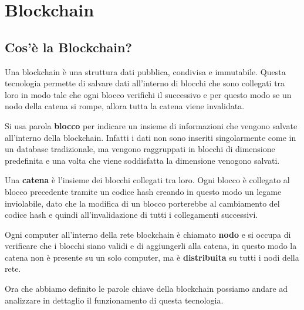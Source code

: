 \section{Blockchain}

\subsection{Cos'è la Blockchain?}
Una blockchain è una struttura dati pubblica, condivisa e immutabile.
Questa tecnologia permette di salvare dati all'interno di blocchi che sono 
collegati tra loro in modo tale che ogni blocco verifichi il successivo e per 
questo modo se un nodo della catena si rompe, allora tutta la catena viene
invalidata.

Si usa parola \textbf{blocco} per indicare un insieme di informazioni che
vengono salvate all'interno della blockchain. Infatti i dati non sono inseriti
singolarmente come in un database tradizionale, ma vengono raggruppati in
blocchi di dimensione predefinita e una volta che viene soddisfatta la
dimensione venogono salvati.

Una \textbf{catena} è l'insieme dei blocchi collegati tra loro. Ogni blocco è 
collegato al blocco precedente tramite un codice hash creando in questo modo
un legame inviolabile, dato che la modifica di un blocco porterebbe al 
cambiamento del codice hash e quindi all'invalidazione di tutti i collegamenti
successivi.

Ogni computer all'interno della rete blockchain è chiamato \textbf{nodo} e
si occupa di verificare che i blocchi siano validi e di aggiungerli alla
catena, in questo modo la catena non è presente su un solo computer, ma è 
\textbf{distribuita} su tutti i nodi della rete.

Ora che abbiamo definito le parole chiave della blockchain possiamo andare ad
analizzare in dettaglio il funzionamento di questa tecnologia.
